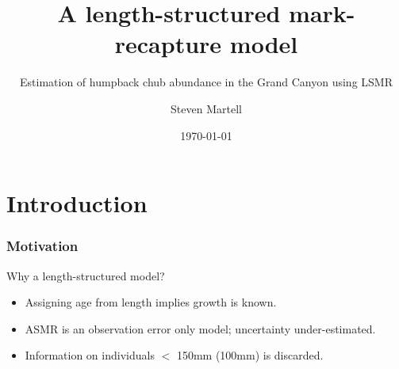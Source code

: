 \documentclass{beamer}
\title[LSMR]{A length-structured mark-recapture model}
\subtitle{Estimation of humpback chub abundance in the Grand Canyon using LSMR}
\author{Steven Martell}
\institute[UBC]
{
University of British Columbia \\
\medskip
{\emph{martell.steve@gmail.com}}
}
\date{\today}
\begin{document}
%
\begin{frame}
\titlepage
\end{frame}
%
%
\section[Introduction]{Introduction} %
\label{sec:introduction}
%
\begin{frame}
\frametitle{Motivation}
\begin{block}
{Why a length-structured model?}
\begin{itemize}
	\item Assigning age from length implies growth is known.
	\item ASMR is an observation error only model; uncertainty under-estimated.
	\item Information on individuals $<$ 150mm (100mm) is discarded.
\end{itemize}

\end{block}
\end{frame}
\end{document}
